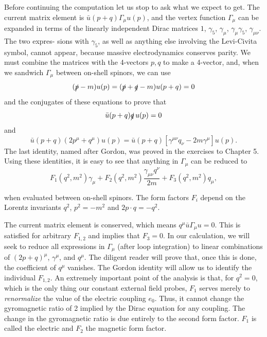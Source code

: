 Before continuing the computation let us stop to ask what we expect to get. The
current matrix element is $\bar u(p+q)\Gamma_\mu u(p)$, and the vertex function $\Gamma_\mu$ can be expanded
in terms of the linearly independent Dirac matrices $1$, $\gamma_5$, $\gamma_\mu$, $\gamma_\mu\gamma_5$, $\gamma_{\mu\nu}$. The two expres-
sions with $\gamma_5$, as well as anything else involving the Levi-Civita symbol, cannot appear,
because massive electrodynamics conserves parity. We must combine the matrices with
the 4-vectors $p,q$ to make a 4-vector, and, when we sandwich $\Gamma_\mu$ between on-shell
spinors, we can use
\begin{equation*}
  (\slashed p-m)u(p)=(\slashed p+\slashed q-m)u(p+q)=0
\end{equation*}
and the conjugates of these equations to prove that
\begin{equation*}
  \bar u(p+q)\slashed q\,u(p)=0
\end{equation*}
and
\begin{equation*}
 \bar u(p+q)(2p^\mu+q^\mu)u(p)
  =\bar u(p+q)[\gamma^{\mu\nu}q_\nu-2m\gamma^\mu]u(p).
\end{equation*}
The last identity, named after Gordon, was proved in the exercises to Chapter 5. Using
these identities, it is easy to see that anything in $\Gamma_\mu$ can be reduced to
\begin{equation*}
  F_1(q^2,m^2)\gamma_\mu+F_2(q^2,m^2)\frac{\gamma_{\mu\nu}q^\nu}{2m}
  +F_3(q^2,m^2)q_\mu,
\end{equation*}

when evaluated between on-shell spinors. The form factors $F_i$ depend on the Lorentz
invariants $q^2$, $p^2=-m^2$ and $2p\!\cdot q=-q^2$.


The current matrix element is conserved, which means $q^\mu\bar u\Gamma_\mu u=0$. This is satisfied
for arbitrary $F_{1,2}$ and implies that $F_3=0$. In our calculation, we will seek to reduce
all expressions in $\Gamma_\mu$ (after loop integration) to linear combinations of $(2p+q)^\mu$, $\gamma^\mu$,
and $q^\mu$. The diligent reader will prove that, once this is done, the coefficient of $q^\mu$
vanishes. The Gordon identity will allow us to identify the individual $F_{1,2}$. An extremely
important point of the analysis is that, for $q^2=0$, which is the only thing our constant
external field probes, $F_1$ serves merely to \emph{renormalize} the value of the electric coupling
$e_0$. Thus, it cannot change the gyromagnetic ratio of 2 implied by the Dirac equation
for any coupling. The change in the gyromagnetic ratio is due entirely to the second
form factor. $F_1$ is called the electric and $F_2$ the magnetic form factor.

